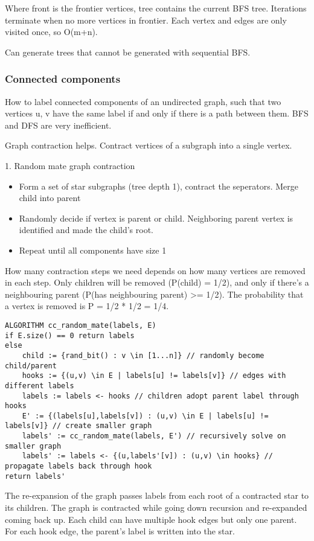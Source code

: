 Where front is the frontier vertices, tree contains the current BFS tree. Iterations terminate when no more vertices in frontier. Each vertex and edges are only visited once, so O(m+n).

Can generate trees that cannot be generated with sequential BFS.

\subsubsection{Connected components}

How to label connected components of an undirected graph, such that two vertices u, v have the same label if and only if there is a path between them. BFS and DFS are very inefficient.

Graph contraction helps. Contract vertices of a subgraph into a single vertex.

1. Random mate graph contraction
\begin{itemize}
    \item Form a set of star subgraphs (tree depth 1), contract the seperators. Merge child into parent
    \item Randomly decide if vertex is parent or child. Neighboring parent vertex is identified and made the child's root. 
    \item Repeat until all components have size 1
\end{itemize}

How many contraction steps we need depends on how many vertices are removed in each step. Only children will be removed (P(child) = 1/2), and only if there's a neighbouring parent (P(has neighbouring parent) >= 1/2). The probability that a vertex is removed is P = 1/2 * 1/2 = 1/4. 

\begin{lstlisting}
ALGORITHM cc_random_mate(labels, E)
if E.size() == 0 return labels
else
    child := {rand_bit() : v \in [1...n]} // randomly become child/parent
    hooks := {(u,v) \in E | labels[u] != labels[v]} // edges with different labels
    labels := labels <- hooks // children adopt parent label through hooks
    E' := {(labels[u],labels[v]) : (u,v) \in E | labels[u] != labels[v]} // create smaller graph
    labels' := cc_random_mate(labels, E') // recursively solve on smaller graph
    labels' := labels <- {(u,labels'[v]) : (u,v) \in hooks} // propagate labels back through hook
return labels'
\end{lstlisting}

The re-expansion of the graph passes labels from each root of a contracted star to its children. The graph is contracted while going down recursion and re-expanded coming back up. Each child can have multiple hook edges but only one parent. For each hook edge, the parent's label is written into the star. 

